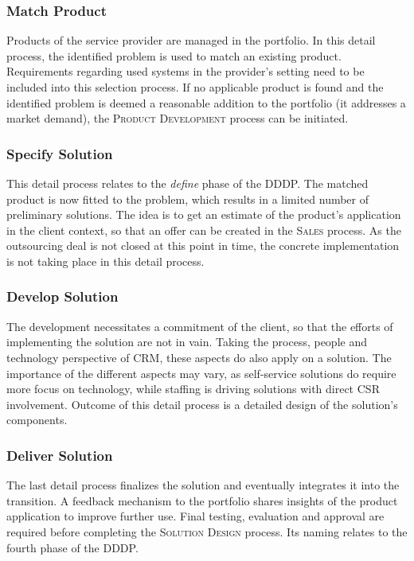 	\subsubsection{Match Product}
	Products of the service provider are managed in the portfolio. In this detail process, the identified problem is used to match an existing product. Requirements regarding used systems in the provider's setting need to be included into this selection process. If no applicable product is found and the identified problem is deemed a reasonable addition to the portfolio (\ie it addresses a market demand), the \textsc{Product Development} process can be initiated. 
	
	\subsubsection{Specify Solution}
	This detail process relates to the \textit{define} phase of the \acrshort{DDDP}. The matched product is now fitted to the problem, which results in a limited number of preliminary solutions. The idea is to get an estimate of the product's application in the client context, so that an offer can be created in the \textsc{Sales} process. As the outsourcing deal is not closed at this point in time, the concrete implementation is not taking place in this detail process. 
	
	\subsubsection{Develop Solution}
	The development necessitates a commitment of the client, so that the efforts of implementing the solution are not in vain. Taking the process, people and technology perspective of \acrshort{CRM}, these aspects do also apply on a solution. The importance of the different aspects may vary, as self-service solutions do require more focus on technology, while staffing is driving solutions with direct \acrshort{CSR} involvement. Outcome of this detail process is a detailed design of the solution's components. 
	
	\subsubsection{Deliver Solution}
	
	The last detail process finalizes the solution and eventually integrates it into the transition. A feedback mechanism to the portfolio shares insights of the product application to improve further use. Final testing, evaluation and approval are required before completing the \textsc{Solution Design} process. Its naming relates to the fourth phase of the \acrshort{DDDP}.
	
